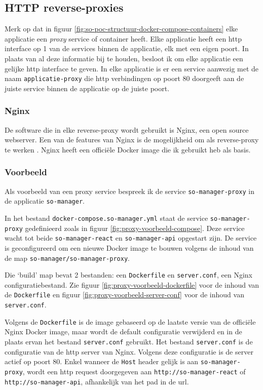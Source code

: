 \documentclass[a4paper, 12pt]{report}
\begin{document}
\subsection{HTTP reverse-proxies}
Merk op dat in figuur \ref{fig:so-poc-structuur-docker-compose-containers} elke applicatie een \emph{proxy} service of container heeft.
Elke applicatie heeft een http interface op 1 van de services binnen de applicatie, elk met een eigen poort.
In plaats van al deze informatie bij te houden, besloot ik om elke applicatie een gelijke http interface te geven.
In elke applicatie is er een service aanwezig met de naam \lstinline|applicatie-proxy| die http verbindingen op poort 80 doorgeeft aan de juiste service binnen de applicatie op de juiste poort.

\subsubsection{Nginx}
De software die in elke reverse-proxy wordt gebruikt is Nginx, een open source webserver.
Een van de features van Nginx is de mogelijkheid om als reverse-proxy te werken \autocite{nginx:about}.
Nginx heeft een officiële Docker image die ik gebruikt heb als basis.

\subsubsection{Voorbeeld}
\label{sec:reverse-proxy-voorbeeld}
Als voorbeeld van een proxy service bespreek ik de service \lstinline|so-manager-proxy| in de applicatie \lstinline|so-manager|.

In het bestand \lstinline|docker-compose.so-manager.yml| staat de service \lstinline|so-manager-proxy| gedefinieerd zoals in figuur \ref{fig:proxy-voorbeeld-compose}.
Deze service wacht tot beide \lstinline|so-manager-react| en \lstinline|so-manager-api| opgestart zijn.
De service is geconfigureerd om een nieuwe Docker image te bouwen volgens de inhoud van de map \lstinline|so-manager/so-manager-proxy|.

Die `build' map bevat 2 bestanden: een \lstinline|Dockerfile| en \lstinline|server.conf|, een Nginx configuratiebestand.
Zie figuur \ref{fig:proxy-voorbeeld-dockerfile} voor de inhoud van de \lstinline|Dockerfile| en figuur \ref{fig:proxy-voorbeeld-server-conf} voor de inhoud van \lstinline|server.conf|.

Volgens de \lstinline|Dockerfile| is de image gebaseerd op de laatste versie van de officiële Nginx Docker image, maar wordt de default configuratie verwijderd en in de plaats ervan het bestand \lstinline|server.conf| gebruikt.
Het bestand \lstinline|server.conf| is de configuratie van de http server van Nginx.
Volgens deze configuratie is de server actief op poort 80.
Enkel wanneer de \lstinline|Host| header gelijk is aan \lstinline|so-manager-proxy|, wordt een http request doorgegeven aan \lstinline|http://so-manager-react| of \lstinline|http://so-manager-api|, afhankelijk van het pad in de url.
\end{document}
